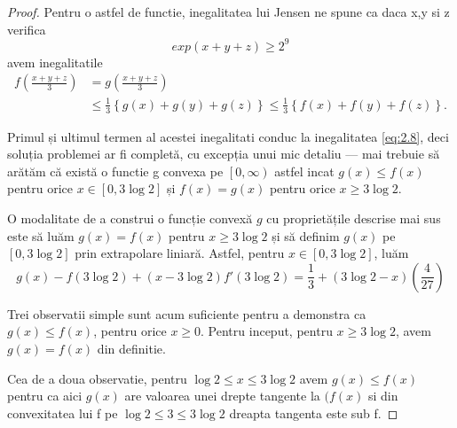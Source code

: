 \documentclass[a4paper,12pt,oneside]{report}
\begin{document}
\begin{proof}
Pentru o astfel de functie, inegalitatea lui Jensen ne spune  ca daca x,y si z verifica \[exp \left ( x + y + z \right )\geq  2^{9} \] avem inegalitatile
\begin{displaymath}
\begin{split}
  f\left ( \frac{x + y + z}{3} \right ) &= g\left ( \frac{x + y + z}{3} \right )\\
   &\leq  \frac{1}{3}\left \{ g\left ( x \right ) + g\left ( y \right ) + g\left ( z \right ) \right \} \leq  \frac{1}{3}\left \{ f\left ( x \right ) + f\left ( y \right ) + f\left ( z \right ) \right \}.
  \end{split}
\end{displaymath}

Primul și ultimul termen al acestei inegalitati conduc la inegalitatea \ref{eq:2.8}, deci soluția problemei ar fi completă, cu excepția unui mic detaliu — mai trebuie să arătăm că există o functie  g convexa pe \( \left [ 0 , \infty  \right ) \) astfel incat  \(g\left ( x \right ) \leq  f\left ( x \right )\) pentru orice  \(x \in \left [ 0 , 3\log 2 \right ]\) și \( f\left ( x \right ) = g\left ( x \right )\) pentru orice \( x \geq 3\log 2\).

O modalitate de a construi o funcție convexă \(g\) cu proprietățile  descrise mai sus este să luăm  \(g\left ( x \right ) = f\left ( x \right )\) pentru \(x \geq  3\log2\) și să definim \(g\left ( x \right )\) pe \(\left [ 0 , 3\log 2 \right ]\) prin extrapolare liniară. Astfel, pentru \(x\in \left [ 0 , 3\log 2 \right ]\), luăm
\begin{displaymath}
  g\left ( x \right ) - f\left ( 3\log 2 \right ) + \left ( x - 3\log 2 \right ){f}'\left ( 3\log2 \right ) = \frac{1}{3} + \left ( 3\log2 - x  \right )\left ( \frac{4}{27} \right )
\end{displaymath}

Trei observatii simple sunt acum suficiente pentru a demonstra ca \(g\left ( x \right )\leq f\left ( x \right )\), pentru orice \(x\geq 0\). Pentru inceput, pentru \(x\geq 3\log 2\), avem \(g\left ( x \right ) = f\left ( x \right )\) din definitie.

Cea de a doua observatie, pentru \(\log 2 \leq  x \leq  3\log 2\) avem  \(g( x )\leq f\left ( x \right ) \) pentru ca aici  \(g\left ( x \right )\) are valoarea unei drepte tangente la \((f\left ( x \right )\) si din convexitatea lui f pe \(\log 2 \leq  3 \leq 3\log 2\) dreapta tangenta este sub f.


\end{proof}
\end{document}
